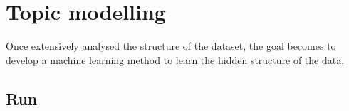 \chapter{Topic modelling}\label{ch:topicmodelling}
Once extensively analysed the structure of the dataset, the goal becomes to develop a machine learning method to learn the hidden structure of the data.









\clearpage
\section{Run}\label{sec:run}


\clearpage


\clearpage


\clearpage
